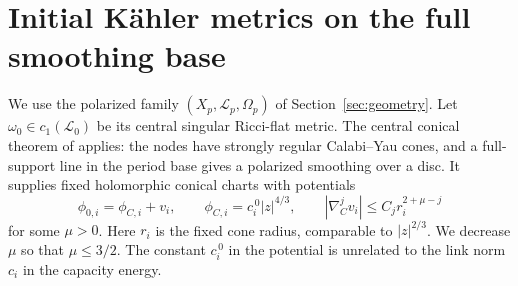 \section{Initial Kähler metrics on the full smoothing base}
\label{sec:initial-metrics}

We use the polarized family
$(X_p,\mathcal L_p,\Omega_p)$ of Section~\ref{sec:geometry}.
Let $\omega_0\in c_1(\mathcal L_0)$ be its central singular
Ricci-flat metric. The central conical theorem of
\cite[Theorem~1.4 and Lemma~A.1]{hein-sun} applies: the nodes
have strongly regular Calabi--Yau cones, and a full-support
line in the period base gives a polarized smoothing over a disc.
It supplies fixed holomorphic conical charts with potentials
\begin{equation}\label{eq:central-conical-potentials}
 \phi_{0,i}=\phi_{C,i}+v_i,\qquad
 \phi_{C,i}=c_i^{\,0}|z|^{4/3},\qquad
 |\nabla_C^jv_i|\le C_jr_i^{2+\mu-j}
\end{equation}
for some $\mu>0$. Here $r_i$ is the fixed cone radius,
comparable to $|z|^{2/3}$. We decrease $\mu$ so that $\mu\le3/2$.
The constant $c_i^{\,0}$ in the potential is unrelated to the
link norm $c_i$ in the capacity energy.

